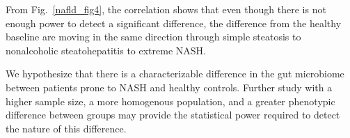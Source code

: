 From Fig.~\ref{nafld_fig4}, the correlation shows that even though there is not enough power to detect a significant difference, the difference from the healthy baseline are moving in the same direction through simple steatosis to nonalcoholic steatohepatitis to extreme NASH.

We hypothesize that there is a characterizable difference in the gut microbiome between patients prone to NASH and healthy controls. Further study with a higher sample size, a more homogenous population, and a greater phenotypic difference between groups may provide the statistical power required to detect the nature of this difference.
